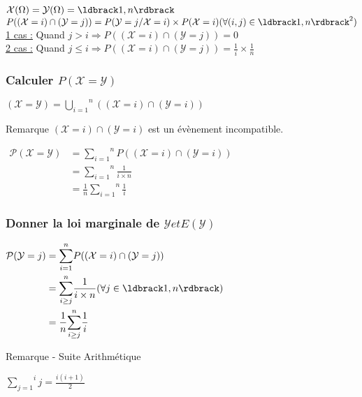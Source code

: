 \documentclass[a4paper, 12pt]{article}
\begin{document}
$\mathcal{X} (\Omega) = \mathcal{Y} (\Omega) = \ldbrack 1, n \rdbrack$\\
$P ((\mathcal{X} = i) \cap (\mathcal{Y} = j)) = P (\mathcal{Y} = j / \mathcal{X} = i) \times P (\mathcal{X} = i) (\forall (i, j) \in \ldbrack 1, n \rdbrack^2)$\\
\underline{1 cas :} Quand $j > i \Rightarrow P ((\mathcal{X} = i) \cap (\mathcal{Y} = j)) = 0$\\
\underline{2 cas :} Quand $j \leq i \Rightarrow P ((\mathcal{X} = i) \cap (\mathcal{Y} = j)) = \frac{1}{i} \times \frac{1}{n}$\\


\subsubsection{Calculer $P (\mathcal{X} = \mathcal{Y})$}
$\mathcal{(X = Y)} = \overset{n}{\underset{i = 1}{\bigcup}} ((\mathcal{X} = i) \cap (\mathcal{Y} = i))$

\begin{remarque}{Remarque}
$(\mathcal{X} = i) \cap (\mathcal{Y} = i)$ est un évènement incompatible.
\end{remarque}

$
\begin{aligned}
\mathcal{P (X = Y)} &= \overset{n}{\underset{i = 1}{\sum}} P ((\mathcal{X} = i) \cap (\mathcal{Y} = i)) \\
&=  \overset{n}{\underset{i = 1}{\sum}} \frac{1}{i \times n} \\
&= \frac{1}{n}  \overset{n}{\underset{i = 1}{\sum}} \frac{1}{i}
\end{aligned}
$


\subsubsection{Donner la loi marginale de $\mathcal{Y} et E (\mathcal{Y})$}
$
\begin{aligned}
\mathcal{P (Y} = j) &= \overset{n}{\underset{i = 1}{\sum}} P((\mathcal{X} = i) \cap (\mathcal{Y} = j)) \\
&= \overset{n}{\underset{i \geq j}{\sum}} \frac{1}{i \times n} (\forall j \in \ldbrack 1, n \rdbrack) \\
&= \frac{1}{n}  \overset{n}{\underset{i \geq j}{\sum}} \frac{1}{i}
\end{aligned}
$

\begin{remarque}{Remarque - Suite Arithmétique}
{
\Large
\begin{center}
$\overset{i}{\underset{j = 1}{\sum}} j = \frac{i (i + 1)}{2}$
\end{center}
}
\end{remarque}
\end{document}

